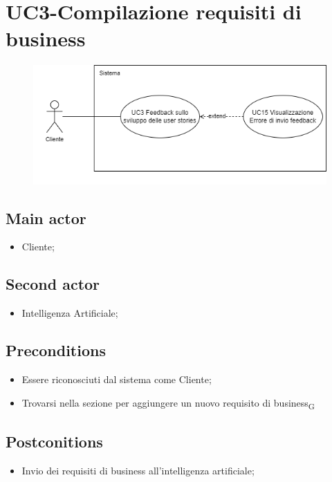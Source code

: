\documentclass{article}
\begin{document}
    
\section{UC3-Compilazione requisiti di business}
    \begin{figure}[h]
      \centering
      \includegraphics[width=.8\textwidth, height=.6\textheight, keepaspectratio]{./imgUML/UC3.png}
      \label{fig:immagine}
    \end{figure}
     \subsection*{Main actor}
     \begin{itemize}
         \item Cliente;
     \end{itemize}
      \subsection*{Second actor}
     \begin{itemize}
         \item Intelligenza Artificiale;
     \end{itemize}
     \subsection*{Preconditions} 
     \begin{itemize}
         \item Essere riconosciuti dal sistema come Cliente;
         \item Trovarsi nella sezione per aggiungere un nuovo requisito di business\textsubscript{G} 
     \end{itemize}
     \subsection*{Postconitions} 
        \begin{itemize}
            \item Invio dei requisiti di business all'intelligenza artificiale;
        \end{itemize}
        
\end{document}
